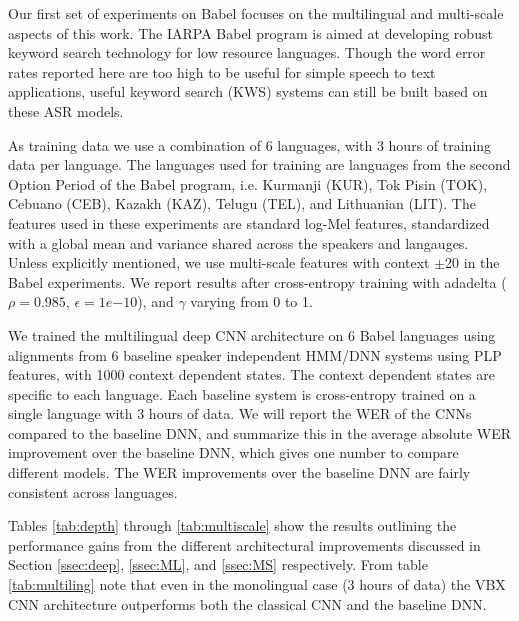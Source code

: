 \documentclass{article}
\begin{document}
Our first set of experiments on Babel focuses on the multilingual and multi-scale
aspects of this work.
The IARPA Babel program is aimed at developing robust keyword search technology
for low resource languages.
Though the word error rates reported here are too high to be useful for simple speech to text applications,
useful keyword search (KWS) systems can still be built based on these ASR models.

As training data we use a combination of 6 languages, with 3 hours
of training data per language.
The languages used for training are languages from the second Option Period of the Babel
program, i.e. Kurmanji (KUR), Tok Pisin (TOK), Cebuano (CEB), Kazakh (KAZ), Telugu (TEL),
and Lithuanian (LIT).
The features used in these experiments are standard log-Mel features,
standardized with a global mean and variance shared across the speakers and langauges.
Unless explicitly mentioned, we use multi-scale features with context $\pm$20 in the Babel experiments.
We report results after cross-entropy training with adadelta ($\rho=0.985$, $\epsilon=1e{-10}$),
and $\gamma$ varying from 0 to 1.

We trained the multilingual deep CNN architecture on 6 Babel languages using
alignments from 6 baseline speaker independent HMM/DNN systems using PLP features,
with 1000 context dependent states.
The context dependent states are specific to each language.
Each baseline system is cross-entropy trained on a single language with 3 hours of data.
We will report the WER of the CNNs compared to the baseline DNN,
and summarize this in the average absolute WER improvement over the baseline DNN,
which gives one number to compare different models.
The WER improvements over the baseline DNN are fairly consistent across languages.

Tables \ref{tab:depth} through \ref{tab:multiscale}
show the results outlining the performance gains from the different architectural improvements 
discussed in Section \ref{ssec:deep}, \ref{ssec:ML}, and \ref{ssec:MS} respectively.
From table \ref{tab:multiling} note that even in the monolingual case
(3 hours of data) the VBX CNN architecture outperforms both the classical CNN and the baseline DNN.
\end{document}
